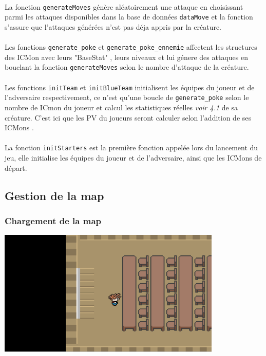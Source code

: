 \documentclass[12pt,a4paper, twoside]{article}
\begin{document}
    \paragraph{} La fonction \texttt{generateMoves} génère aléatoirement une attaque en choisissant parmi les attaques disponibles dans la base de données \texttt{dataMove} et la fonction s'assure que l'attaques générées n'est pas déja appris par la créature.
    \paragraph{} Les fonctions \texttt{generate\_poke} et \texttt{generate\_poke\_ennemie} affectent les structures des ICMon avec leurs "BaseStat" , leurs niveaux et lui génere des attaques en bouclant la fonction \texttt{generateMoves} selon le nombre d'attaque de la créature.
    \paragraph{} Les fonctions \texttt{initTeam} et \texttt{initBlueTeam} initialisent les équipes du joueur et de l'adversaire respectivement, ce n'est qu'une boucle de \texttt{generate\_poke}  selon le nombre de ICmon du joueur et calcul les statistiques réelles \emph{voir 4.1} de sa créature. C'est ici que les PV du joueurs seront calculer selon l'addition de ses ICMons .

    \paragraph{} La fonction \texttt{initStarters} est la première fonction appelée lors du lancement du jeu, elle initialise les équipes du joueur et de l'adversaire, ainsi que les ICMons de départ.\\
\newpage
\subsection{Gestion de la map}

    \subsubsection{Chargement de la map}
    \includegraphics[width=0.8\textwidth]{../docs/img/screenshots/screen2.png}
    \newline
\end{document}
